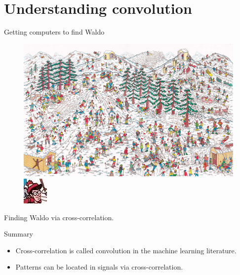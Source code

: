 \documentclass{beamer}
\begin{document}
    \section{Understanding convolution}

    \begin{frame}{Getting computers to find Waldo}
        \begin{figure}
            \includegraphics[scale=0.1]{./python/waldo_snow.jpg}
            \includegraphics{./python/waldo_small.jpg}
        \end{figure}
    \end{frame}

    \begin{frame}{Finding Waldo via cross-correlation.}
        \begin{figure}
        \centering
        
        \end{figure}
    \end{frame}

    \begin{frame}{Summary}
        \begin{itemize}
            \item Cross-correlation is called convolution in the machine learning literature.
            \item Patterns can be located in signals via cross-correlation.
        \end{itemize}
    \end{frame}
\end{document}
